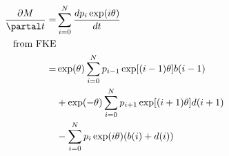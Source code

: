 \documentclass[9pt]{beamer}
\begin{document}
    \begin{frame}{}
        \begin{align*}
            \frac{\partial M}{\partal t}
                =&
                    \sum_{i = 0} ^ N 
                        \frac{d p_i \exp(i \theta)}{dt}
                \\
                    \text{from FKE} &
                \\
                    = &
                   \exp(\theta) 
                       \sum_{i = 0} ^N 
                           p_{i - 1} \exp[(i - 1) \theta] b(i-1)
                \\
                    & +
                   \exp(- \theta)
                       \sum_{i = 0} ^N 
                           p_{i + 1} \exp[(i + 1) \theta] d(i + 1)
               \\
                   & -
                    \sum_{i = 0} ^ N
                       p_i \exp(i \theta) (b(i) + d(i))
        \end{align*}
    \end{frame}
\end{document}
